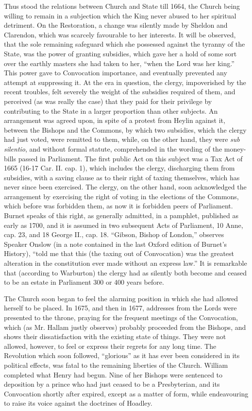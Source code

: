 Thus stood the relations
between Church and State till 1664, the Church being willing to remain
in a subjection which the King never abused to her spiritual
detriment. On the Restoration, a change was silently made by Sheldon
and Clarendon, which was scarcely favourable to her interests. It will
be observed, that the sole remaining safeguard which she possessed
against the tyranny of the State, was the power of granting subsidies,
which gave her a hold of some sort over the earthly masters she had
taken to her, ``when the Lord was her king.'' This power gave to
Convocation importance, and eventually prevented any attempt at
suppressing it. At the era in question, the clergy, impoverished by
the recent troubles, felt severely the weight of the subsidies
required of them, and perceived (as was really the case) that they
paid for their privilege by contributing to the State in a larger
proportion than other subjects. An arrangement was agreed upon, in
spite of a protest from Heylin against it, between the Bishops and the
Commons, by which two subsidies, which the clergy had just voted, were
remitted to them, while, on the other hand, they were \emph{sub silentio},
and without formal statute, comprehended in the wording of the
money-bills passed in Parliament. The first public Act on this subject
was a Tax Act of 1665 (16-17 Car. II. cap. 1), which includes the
clergy, discharging them from subsidies, with a saving clause as to
their right of taxing themselves, which has never since been
exercised. The clergy, on the other hand, soon acknowledged the
arrangement by exercising the right of voting in the elections of the
Commons, which before was forbidden them, as now it is forbidden peers
of Parliament. Burnet speaks of this right, as generally
admitted, in a pamphlet, published as early as 1700, and it is assumed
in two subsequent Acts of Parliament, 10 Anne, cap. 23, and 18 George
II., cap. 18. ``Gibson, Bishop of London,'' observes Speaker Onslow (in
a note contained in the last Oxford edition of Burnet's History), ``told
me that this (the taxing out of Convocation) was the greatest
alteration in the constitution ever made without an express law.'' It
is remarkable that (according to Warburton) the clergy had as silently
both become and ceased to be an estate in Parliament 300 or 400 years
before.

The Church soon began to feel
the alarming position in which she had allowed herself to be placed.
In 1675, and then in 1677, addresses from the Lords were presented to
the throne, praying for the frequent meetings of the Convocation,
which (as Mr. Hallam justly observes) probably proceeded from the
Bishops, and shows their dissatisfaction with the existing state of
things. They were not allowed, however, to feel or express their
regrets for any long time. The Revolution which soon followed, ``glorious''
as it has ever been considered in its political effects, was fatal to
the remaining liberties of the Church. William completed what Henry
had begun. Nine of her Bishops were sentenced to deposition by a
prince who had just ceased to be a Presbyterian, and its Convocation
shortly after expired, except as a matter of form, while endeavouring
to raise its voice against the doctrines of Hoadley.


